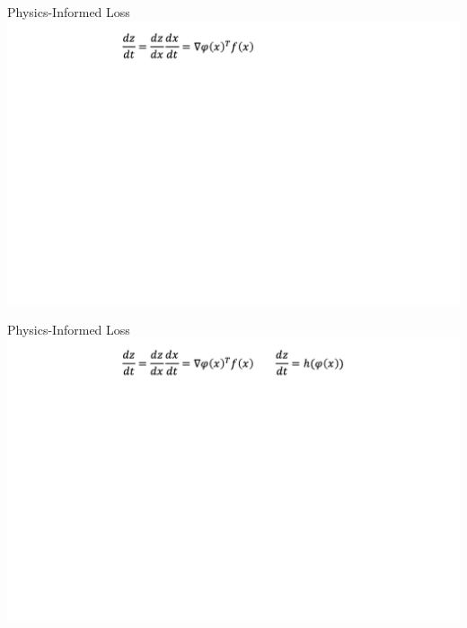 \documentclass[8pt]{beamer}
\begin{document}
\begin{frame}{Physics-Informed Loss}
\includegraphics[width=\textwidth]{Figures/collocations_1.png}
\end{frame}

\begin{frame}{Physics-Informed Loss}
	\includegraphics[width=\textwidth]{Figures/collocations_2.png}
\end{frame}
\end{document}
